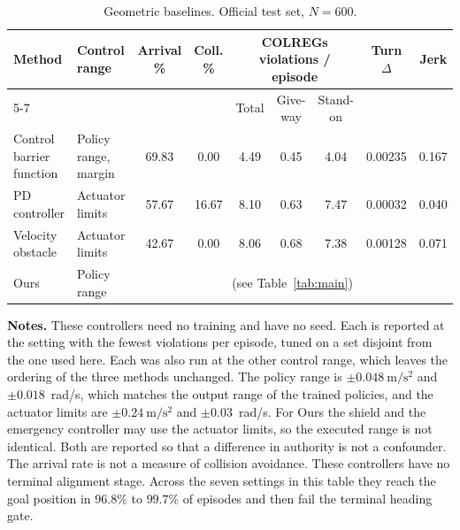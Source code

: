 \documentclass[10pt,letterpaper]{article}
\newcommand{\capsize}{\fontsize{10}{12}\selectfont}
\newcommand{\capnote}[1]{{\normalfont\capsize #1}}
\begin{document}
\begin{table}[htbp]
 \caption{Geometric baselines. \capnote{Official test set, $N=600$.}}
 \label{tab:ext}
 \centering\capsize
 \setlength{\tabcolsep}{2pt}
 \begin{tabular*}{\linewidth}{@{\extracolsep{\fill}}llccccccc@{}}
  \toprule
  \multirow{2}{*}{Method} & \multirow{2}{*}{Control range} & \multirow{2}{*}{Arrival \%} & \multirow{2}{*}{Coll. \%}
   & \multicolumn{3}{c}{COLREGs violations / episode} & \multirow{2}{*}{Turn $\Delta$} & \multirow{2}{*}{Jerk} \\
  \cmidrule(lr){5-7}
   & & & & Total & Give-way & Stand-on & & \\
  \midrule
    Control barrier function & Policy range, margin & 69.83 & 0.00 & 4.49 & 0.45 & 4.04 & 0.00235 & 0.167 \\
  PD controller            & Actuator limits      & 57.67 & 16.67 & 8.10 & 0.63 & 7.47 & 0.00032 & 0.040 \\
  Velocity obstacle        & Actuator limits      & 42.67 & 0.00 & 8.06 & 0.68 & 7.38 & 0.00128 & 0.071 \\
  \addlinespace
  Ours                     & Policy range & \multicolumn{7}{c}{(see Table~\ref{tab:main})} \\
  \bottomrule
 \end{tabular*}

 \vspace{4pt}
 \begin{minipage}{\linewidth}\capsize
 \textbf{Notes.} These controllers need no training and have no seed. Each is reported at
the setting with the fewest violations per episode, tuned on a set disjoint from the one
used here. Each was also run at the other control range, which leaves the ordering of
the three methods unchanged. The policy range is $\pm0.048~\mathrm{m/s^2}$ and $\pm0.018$~rad/s, which matches the
output range of the trained policies, and the actuator limits are
$\pm0.24~\mathrm{m/s^2}$ and $\pm0.03$~rad/s. For Ours the shield and the emergency
controller may use the actuator limits, so the executed range is not identical. Both are reported so that a difference in
 authority is not a confounder. The arrival rate is not a measure of collision avoidance. These controllers have no terminal alignment stage. Across the seven settings in this
table they reach the goal position in $96.8\%$ to $99.7\%$ of episodes and then fail the
terminal heading gate.
 \end{minipage}
\end{table}
\end{document}
